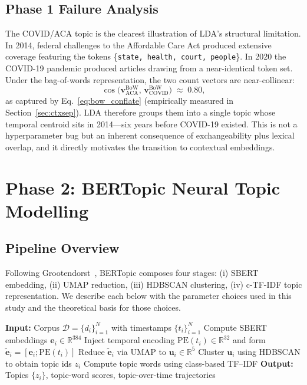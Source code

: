 \documentclass[10pt,twocolumn,a4paper]{article}
\begin{document}
\subsection{Phase 1 Failure Analysis}
\label{sec:phase1fail}

The COVID/ACA topic is the clearest illustration of LDA's structural limitation. In 2014, federal challenges to the Affordable Care Act produced extensive coverage featuring the tokens \{\texttt{state, health, court, people}\}. In 2020 the COVID-19 pandemic produced articles drawing from a near-identical token set. Under the bag-of-words representation, the two count vectors are near-collinear:
\begin{equation}
\label{eq:bow_conflate}
\cos\!\bigl(\mathbf{v}^{\text{BoW}}_{\text{ACA}},\,\mathbf{v}^{\text{BoW}}_{\text{COVID}}\bigr) \;\approx\; 0.80,
\end{equation}
as captured by Eq.~\eqref{eq:bow_conflate} (empirically measured in Section~\ref{sec:ctxsep}). LDA therefore groups them into a single topic whose temporal centroid sits in 2014---six years before COVID-19 existed. This is not a hyperparameter bug but an inherent consequence of exchangeability plus lexical overlap, and it directly motivates the transition to contextual embeddings.

\section{Phase 2: BERTopic Neural Topic Modelling}
\label{sec:phase2}

\subsection{Pipeline Overview}
\label{sec:pipeline}

Following Grootendorst~\cite{grootendorst2022}, BERTopic composes four stages: (i) SBERT embedding, (ii) UMAP reduction, (iii) HDBSCAN clustering, (iv) c-TF-IDF topic representation. We describe each below with the parameter choices used in this study and the theoretical basis for those choices.

\begin{algorithm}[H]
\caption{BERTopic Pipeline}
\label{alg:bertopic}
\footnotesize
\begin{algorithmic}[1]
\STATE \textbf{Input:} Corpus $\mathcal{D}=\{d_i\}_{i=1}^{N}$ with timestamps $\{t_i\}_{i=1}^{N}$
\STATE Compute SBERT embeddings $\bm{e}_i \in \mathbb{R}^{384}$
\STATE Inject temporal encoding $\text{PE}(t_i)\in\mathbb{R}^{32}$ and form $\tilde{\bm{e}}_i=[\bm{e}_i;\text{PE}(t_i)]$
\STATE Reduce $\tilde{\bm{e}}_i$ via UMAP to $\bm{u}_i \in \mathbb{R}^{5}$
\STATE Cluster $\bm{u}_i$ using HDBSCAN to obtain topic ids $z_i$
\STATE Compute topic words using class-based TF--IDF
\STATE \textbf{Output:} Topics $\{z_i\}$, topic-word scores, topic-over-time trajectories
\end{algorithmic}
\end{algorithm}
\end{document}
